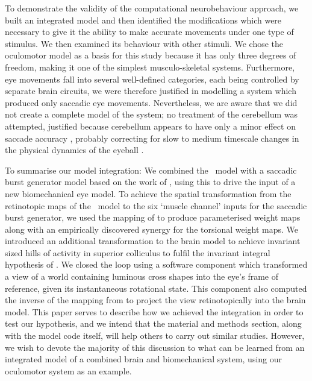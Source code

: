 \documentclass{frontiersSCNS}
\begin{document}
To demonstrate the validity of the computational neurobehaviour
approach, we built an integrated model and then identified the
modifications which were necessary to give it the ability to make
accurate movements under one type of stimulus. We then examined its
behaviour with other stimuli. We chose the oculomotor model as a basis
for this study because it has only three degrees of freedom, making it
one of the simplest musculo-skeletal systems. Furthermore, eye
movements fall into several well-defined categories, each being
controlled by separate brain circuits, we were therefore justified in
modelling a system which produced only saccadic eye
movements. Nevertheless, we are aware that we did not create a
complete model of the system; no treatment of the cerebellum was
attempted, justified because cerebellum appears to have only a minor
effect on saccade accuracy \citep{dean_adaptive_2008}, probably
correcting for slow to medium timescale changes in the physical
dynamics of the eyeball \citep{dean_learning_1994}.

To summarise our model integration: We combined
the \ccg~model \citep{cope_basal_2017} with a saccadic burst generator
model based on the work of \cite{gancarz_neural_1998}, using this to
drive the input of a new biomechanical eye model. To achieve the
spatial transformation from the retinotopic maps of the \ccg~model to
the six `muscle channel' inputs for the saccadic burst generator, we
used the mapping of \cite{ottes_visuomotor_1986} to produce
parameterised weight maps along with an empirically discovered synergy
for the torsional weight maps. We introduced an additional
transformation to the brain model to achieve invariant sized hills of
activity in superior colliculus to fulfil the invariant integral
hypothesis of \cite{tabareau_geometry_2007}. We closed the loop using
a software component which transformed a view of a world containing
luminous cross shapes into the eye's frame of reference, given its
instantaneous rotational state. This component also computed the
inverse of the mapping from \cite{ottes_visuomotor_1986} to project
the view retinotopically into the brain model.
%
This paper serves to describe how we achieved the integration in order
to test our hypothesis, and we intend that the material and methods
section, along with the model code itself, will help others to carry
out similar studies. However, we wish to devote the majority of this
discussion to what can be learned from an integrated model of a
combined brain and biomechanical system, using our oculomotor system
as an example.
\end{document}
